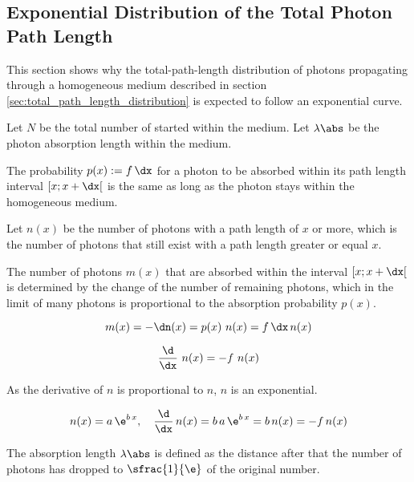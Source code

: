 
\subsection{Exponential Distribution of the Total Photon Path Length}
\label{sec:exponential_distribution}

This section shows why the total-path-length distribution of photons propagating through a homogeneous medium described in section \ref{sec:total_path_length_distribution} is expected to follow an exponential curve.


Let $N$ be the total number of started within the medium. Let $\lambda\abs$ be the photon absorption length within the medium.

The probability $p(x):=f\,\dx$ for a photon to be absorbed within its path length interval $[x; x + \dx[$ is the same as long as the photon stays within the homogeneous medium.

Let $n(x)$ be the number of photons with a path length of $x$ or more, which is the number of photons that still exist with a path length greater or equal $x$.

The number of photons $m(x)$ that are absorbed within the interval $[x; x + \dx[$ is determined by the change of the number of remaining photons, which in the limit of many photons is proportional to the absorption probability $p(x)$.

$$ m(x) = -\dn(x) = p(x)\ n(x) = f\,\dx\,n(x) $$

$$ \frac{\d}{\dx}\ n(x) = -f\ n(x) $$

As the derivative of $n$ is proportional to $n$, $n$ is an exponential.

$$
  n(x) = a\,\e^{b\,x}, \ \ \
  \frac{\d}{\dx}\,n(x) = b\,a\,\e^{b\,x} = b\,n(x) = -f\,n(x)
$$

%

The absorption length $\lambda\abs$ is defined as the distance after that the number of photons has dropped to $\sfrac{1}{\e}$ of the original number.


